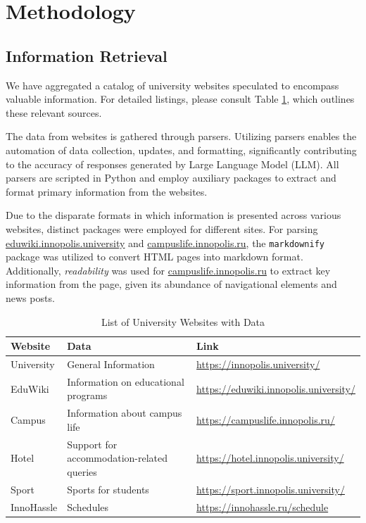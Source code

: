\documentclass[conference, 11pt]{IEEEtran}
\begin{document}
\section{Methodology}

\subsection{Information Retrieval}

We have aggregated a catalog of university websites speculated to encompass valuable information. For detailed listings, please consult Table \ref{tab:university_websites}, which outlines these relevant sources.

The data from websites is gathered through parsers. Utilizing parsers enables the automation of data collection, updates, and formatting, significantly contributing to the accuracy of responses generated by Large Language Model (LLM). All parsers are scripted in Python and employ auxiliary packages to extract and format primary information from the websites.

Due to the disparate formats in which information is presented across various websites, distinct packages were employed for different sites. For parsing \href{https://eduwiki.innopolis.university/}{eduwiki.innopolis.university} and \href{https://campuslife.innopolis.ru/}{campuslife.innopolis.ru}, the \texttt{markdownify} package was utilized to convert HTML pages into markdown format. Additionally, \textit{readability} was used for \href{https://campuslife.innopolis.ru/}{campuslife.innopolis.ru} to extract key information from the page, given its abundance of navigational elements and news posts.

\begin{table}[h] %
\caption{List of University Websites with Data}
\centering
\begin{tabular}{|l|l|l|}
\hline
\textbf{Website} & \textbf{Data} & \textbf{Link} \\
\hline
University & General Information & \url{https://innopolis.university/} \\
EduWiki & Information on educational programs & \url{https://eduwiki.innopolis.university/} \\
Campus & Information about campus life & \url{https://campuslife.innopolis.ru/} \\
Hotel & Support for accommodation-related queries & \url{https://hotel.innopolis.university/} \\
Sport & Sports for students & \url{https://sport.innopolis.university/} \\
InnoHassle & Schedules & \url{https://innohassle.ru/schedule} \\
\hline
\end{tabular}
\label{tab:university_websites}
\end{table}
\end{document}
